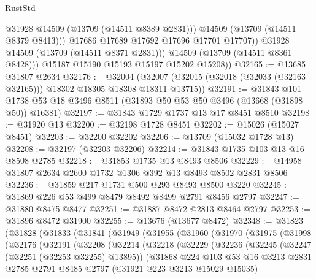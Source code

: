 \begin{lexlean}{RustStd}
\begin{coremodule}
                    @31928
                    @14509
                    (@13709 (@14511 @8389 @2831)))
                  @14509
                  (@13709 (@14511 @8379 @8413)))
                @17686
                @17689
                @17692
                @17696
                @17701
                @17707))
            @31928
            @14509
            (@13709 (@14511 @8371 @2831)))
          @14509
          (@13709 (@14511 @8361 @8428)))
        @15187
        @15190
        @15193
        @15197
        @15202
        @15208))
@32165 := @13685 @31807 @2634
@32176 := @32004
    (@32007 (@32015 (@32018 (@32033 (@32163 @32165))) @18302 @18305 @18308 @18311 @13715))
@32191 := @31843
    @101
    @1738
    @53
    @18
    @3496
    @8511
    (@31893 @50 @53 @50 @3496 (@13668 (@31898 @50)) @16381)
@32197 := @31843 @1729 @1737 @13 @17 @8451 @8510
@32198 := @31920 @13
@32200 := @32198 @1728 @8451
@32202 := @15026 (@15027 @8451)
@32203 := @32200 @32202
@32206 := @13709 (@15032 @1728 @13)
@32208 := @32197 (@32203 @32206)
@32214 := @31843 @1735 @103 @13 @16 @8508 @2785
@32218 := @31853 @1735 @13 @8493 @8506
@32229 := @14958 @31807 @2634 @2600 @1732 @1306 @392 @13 @8493 @8502 @2831 @8506
@32236 := @31859 @217 @1731 @500 @293 @8493 @8500 @3220
@32245 := @31869 @226 @53 @499 @8479 @8492 @8499 @2791 @8456 @2797
@32247 := @31880 @8475 @8477
@32251 := @31887 @8472 @2813 @8464 @2797
@32253 := @31896 @8472 @31900
@32255 := @13676 (@13677 @8472)
@32348 := @31823
    (@31828
      (@31833
        (@31841
          (@31949
            (@31955
              (@31960
                (@31970
                  (@31975
                    (@31998
                      (@32176
                        (@32191
                          (@32208
                            (@32214
                              (@32218
                                (@32229
                                  (@32236
                                    (@32245
                                      (@32247 (@32251 (@32253 @32255) @13895))
                                      (@31868
                                        @224
                                        @103
                                        @53
                                        @16
                                        @3213
                                        @2831
                                        @2785
                                        @2791
                                        @8485
                                        @2797
                                        (@31921 @223 @3213 @15029 @15035)

\end{coremodule}
\end{lexlean}
